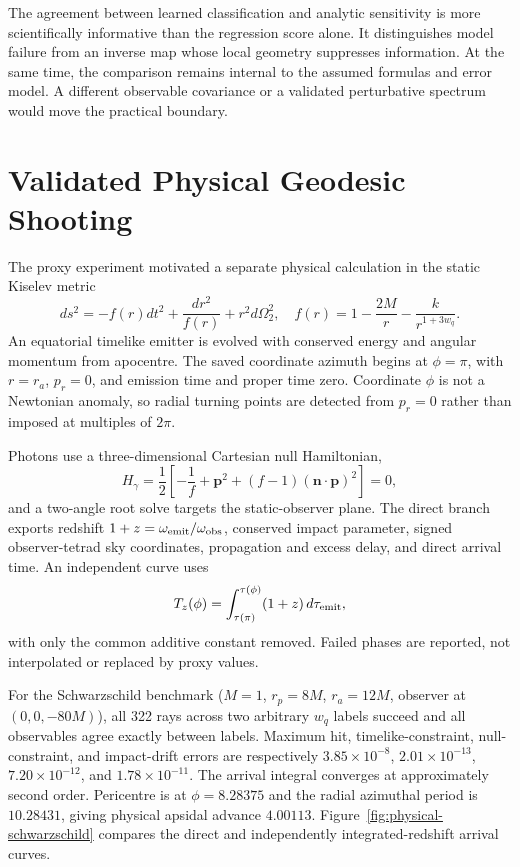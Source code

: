 \documentclass[conference]{IEEEtran}
\newcommand{\wq}{w_q}
\begin{document}
The agreement between learned classification and analytic sensitivity is more
scientifically informative than the regression score alone. It distinguishes
model failure from an inverse map whose local geometry suppresses information.
At the same time, the comparison remains internal to the assumed formulas and
error model. A different observable covariance or a validated perturbative
spectrum would move the practical boundary.

\section{Validated Physical Geodesic Shooting}
The proxy experiment motivated a separate physical calculation in the static
Kiselev metric
\begin{equation}
 ds^2=-f(r)dt^2+\frac{dr^2}{f(r)}+r^2d\Omega_2^2,
 \quad f(r)=1-\frac{2M}{r}-\frac{k}{r^{1+3\wq}}.
\end{equation}
An equatorial timelike emitter is evolved with conserved energy and angular
momentum from apocentre. The saved coordinate azimuth begins at $\phi=\pi$,
with $r=r_a$, $p_r=0$, and emission time and proper time zero. Coordinate
$\phi$ is not a Newtonian anomaly, so radial turning points are detected from
$p_r=0$ rather than imposed at multiples of $2\pi$.

Photons use a three-dimensional Cartesian null Hamiltonian,
\begin{equation}
 H_\gamma=\frac12\left[-\frac{1}{f}+\mathbf p^2+
 (f-1)(\mathbf n\!\cdot\!\mathbf p)^2\right]=0,
\end{equation}
and a two-angle root solve targets the static-observer plane. The direct branch
exports redshift $1+z=\omega_{\rm emit}/\omega_{\rm obs}$, conserved impact
parameter, signed observer-tetrad sky coordinates, propagation and excess
delay, and direct arrival time. An independent curve uses
\begin{equation}
 T_z(\phi)=\int_{\tau(\pi)}^{\tau(\phi)}(1+z)\,d\tau_{\rm emit},
\end{equation}
with only the common additive constant removed. Failed phases are reported,
not interpolated or replaced by proxy values.

For the Schwarzschild benchmark ($M=1$, $r_p=8M$, $r_a=12M$, observer at
$(0,0,-80M)$), all 322 rays across two arbitrary $\wq$ labels succeed and all
observables agree exactly between labels. Maximum hit, timelike-constraint,
null-constraint, and impact-drift errors are respectively
$3.85\times10^{-8}$, $2.01\times10^{-13}$, $7.20\times10^{-12}$, and
$1.78\times10^{-11}$. The arrival integral converges at approximately second
order. Pericentre is at $\phi=8.28375$ and the radial azimuthal period is
$10.28431$, giving physical apsidal advance $4.00113$. Figure~\ref{fig:physical-schwarzschild}
compares the direct and independently integrated-redshift arrival curves.
\end{document}
